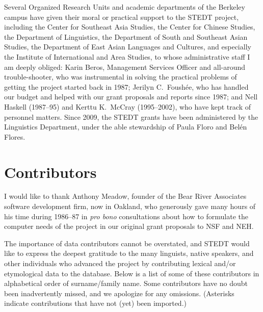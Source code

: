 Several Organized Research Units and academic departments of the Berkeley campus have given their moral or practical support to the STEDT project, including the Center for Southeast Asia Studies, the Center for Chinese Studies, the Department of Linguistics, the Department of South and Southeast Asian Studies, the Department of East Asian Languages and Cultures, and especially the Institute of International and Area Studies, to whose administrative staff I am deeply obliged: Karin Beros, Management Services Officer and all-around trouble-shooter, who was instrumental in solving the practical problems of getting the project started back in 1987; Jerilyn C.\ Foush\'ee, who has handled our budget and helped with our grant proposals and reports since 1987; and Nell Haskell (1987–95) and Kerttu K.\ McCray (1995–2002), who have kept track of personnel matters.  Since 2009, the STEDT grants have been administered by the Linguistics Department, under the able stewardship of Paula Floro and Bel\'en Flores.

\section{Contributors}

I would like to thank Anthony Meadow, founder of the Bear River Associates software development firm, now in Oakland, who generously gave many hours of his time during 1986–87 in {\it pro bono} consultations about how to formulate the computer needs of the project in our original grant proposals to NSF and NEH.

The importance of data contributors cannot be overstated, and STEDT would like to express the deepest gratitude to the many linguists, native speakers, and other individuals who advanced the project by contributing lexical and/or etymological data to the database. Below is a list of some of these contributors in alphabetical order of surname/family name. Some contributors have no doubt been inadvertently missed, and we apologize for any omissions. (Asterisks indicate contributions that have not (yet) been imported.)


